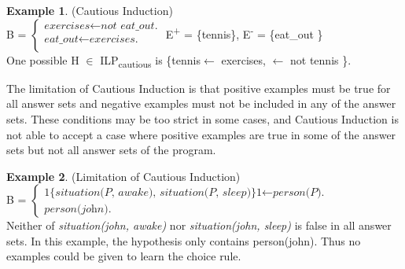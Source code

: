 \documentclass[11pt,twoside]{report}
\theoremstyle{plain}
\theoremstyle{definition}
\newtheorem{examp}{Example}[section]
\begin{document}
\begin{examp} \normalfont (Cautious Induction) \\

B = $\begin{cases}
	\textit{exercises}  \leftarrow \textit{not \ eat\_out.} \\
	\textit{eat\_out} \leftarrow \textit{exercises.} \\
      \end{cases}$
E\textsuperscript{+} = \{tennis\},      E\textsuperscript{-} = \{eat\_out \} \\

One possible  H $\in$ ILP\textsubscript{cautious} is \{tennis$ \leftarrow$ exercises, $\leftarrow$ not tennis \}.
\end{examp}
\label{cautious_induction_example}

The limitation of Cautious Induction is that positive examples must be true for all answer sets and negative examples must not be included in any of the answer sets. These conditions may be too strict in some cases, and Cautious Induction is not able to accept a case where positive examples are true in some of the answer sets but not all answer sets of the program.

\begin{examp} \normalfont (Limitation of Cautious Induction) \\

B = $\begin{cases}
	\textit{1\{situation(P, awake), situation(P, sleep)\}1} \leftarrow \textit{person(P).} \\
	\textit{person(john).}
      \end{cases}$ \\

Neither of \textit{situation(john, awake)} nor \textit{situation(john, sleep)} is false in all answer sets. 
In this example, the hypothesis only contains person(john). Thus no examples could be given to learn the choice rule.
\end{examp}

\label{limitation_cautious}
\end{document}
